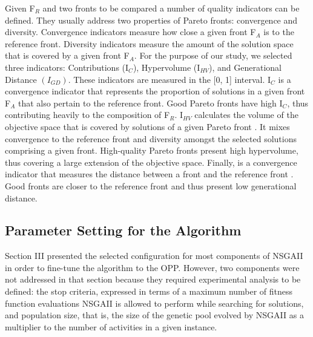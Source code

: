 \documentclass[conference]{IEEEtran}
\begin{document}
Given F$_{R}$ and two fronts to be compared a number of quality indicators can be defined. They usually address two properties of Pareto fronts: convergence and diversity. Convergence indicators measure how close a given front F$_{A}$ is to the reference front. Diversity indicators measure the amount of the solution space that is covered by a given front F$_{A}$. For the purpose of our study, we selected three indicators: Contributions (I$_{C}$), Hypervolume (I$_{HV}$), and Generational Distance $(I_{GD})$. These indicators are measured in the [0, 1] interval. I$_{C}$ is a convergence indicator that represents the proportion of solutions in a given front F$_{A}$ that also pertain to the reference front. Good Pareto fronts have high I$_{C}$, thus contributing heavily to the composition of F$_{R}$. I$_{HV}$ calculates the volume of the objective space that is covered by solutions of a given Pareto front \cite{Durillo:2009}. It mixes convergence to the reference front and diversity amongst the selected solutions comprising a given front. High-quality Pareto fronts present high hypervolume, thus covering a large extension of the objective space. Finally,  is a convergence indicator that measures the distance between a front and the reference front \cite{vanveldhuizen:1998}. Good fronts are closer to the reference front and thus present low generational distance.

\subsection{Parameter Setting for the Algorithm}
Section III presented the selected configuration for most components of NSGAII in order to fine-tune the algorithm to the OPP. However, two components were not addressed in that section because they required experimental analysis to be defined: the stop criteria, expressed in terms of a maximum number of fitness function evaluations NSGAII is allowed to perform while searching for solutions, and population size, that is, the size of the genetic pool evolved by NSGAII as a multiplier to the number of activities in a given instance.
\end{document}
